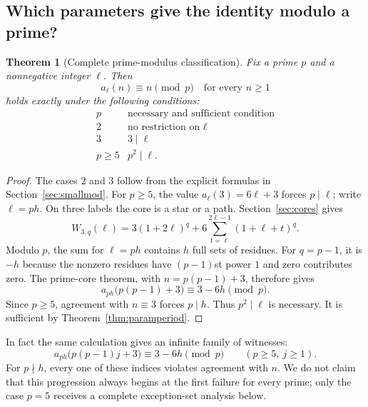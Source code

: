 \documentclass[11pt,letterpaper]{article}
\newtheorem{theorem}{Theorem}[section]
\theoremstyle{definition}
\theoremstyle{remark}
\begin{document}
\subsection{Which parameters give the identity modulo a prime?}
\begin{theorem}[Complete prime-modulus classification]\label{thm:classification}
Fix a prime $p$ and a nonnegative integer $\ell$. Then
\[
 a_\ell(n)\equiv n\pmod p\quad\text{for every }n\ge1
\]
holds exactly under the following conditions:
\begin{equation}\label{eq:classification}
 \begin{array}{c|c}
 p&\text{necessary and sufficient condition}\\\hline
 2&\text{no restriction on }\ell\\
 3&3\mid\ell\\
 p\ge5&p^2\mid\ell.
 \end{array}
\end{equation}
\end{theorem}
\begin{proof}
The cases $2$ and $3$ follow from the explicit formulas in
Section~\ref{sec:smallmod}. For $p\ge5$, the value
$a_\ell(3)=6\ell+3$ forces $p\mid\ell$; write $\ell=ph$.
On three labels the core is a star or a path. Section~\ref{sec:cores}
gives
\[
 W_{3,q}(\ell)=3(1+2\ell)^q+
 6\sum_{t=\ell}^{2\ell-1}(1+\ell+t)^q.
\]
Modulo $p$, the sum for $\ell=ph$ contains $h$ full sets of residues.
For $q=p-1$, it is $-h$ because the nonzero residues have $(p-1)$st
power $1$ and zero contributes zero. The prime-core theorem, with
$n=p(p-1)+3$, therefore gives
\begin{equation}\label{eq:generalwitness}
 a_{ph}\bigl(p(p-1)+3\bigr)\equiv3-6h\pmod p.
\end{equation}
Since $p\ge5$, agreement with $n\equiv3$ forces $p\mid h$.
Thus $p^2\mid\ell$ is necessary. It is sufficient by
Theorem~\ref{thm:paramperiod}.
\end{proof}

In fact the same calculation gives an infinite family of witnesses:
\begin{equation}\label{eq:infiniteprimewitness}
 a_{ph}\bigl(p(p-1)j+3\bigr)\equiv3-6h\pmod p
 \qquad(p\ge5,\ j\ge1).
\end{equation}
For $p\nmid h$, every one of these indices violates agreement with $n$.
We do not claim that this progression always begins at the first failure
for every prime; only the case $p=5$ receives a complete exception-set
analysis below.
\end{document}
